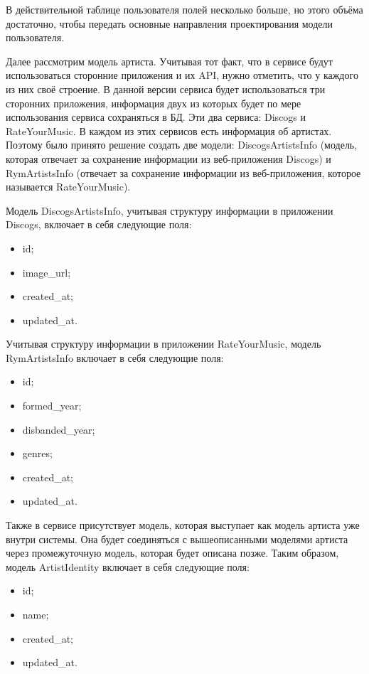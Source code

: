 В действительной таблице пользователя полей несколько больше, но этого объёма достаточно, чтобы передать основные направления проектирования модели пользователя.

Далее рассмотрим модель артиста. Учитывая тот факт, что в сервисе будут использоваться сторонние приложения и их API, нужно отметить, что у каждого из них своё строение. В данной версии сервиса будет использоваться три сторонних приложения, информация двух из которых будет по мере использования сервиса сохраняться в БД. Эти два сервиса: Discogs и RateYourMusic. В каждом из этих сервисов есть информация об артистах. Поэтому было принято решение создать две модели: DiscogsArtistsInfo (модель, которая отвечает за сохранение информации из веб-приложения Discogs) и RymArtistsInfo (отвечает за сохранение информации из веб-приложения, которое называется RateYourMusic).

Модель DiscogsArtistsInfo, учитывая структуру информации в приложении Discogs, включает в себя следующие поля:

\begin{itemize}
  \item id;
  \item image\_url;
  \item created\_at;
  \item updated\_at.
\end{itemize}

Учитывая структуру информации в приложении RateYourMusic, модель RymArtistsInfo включает в себя следующие поля:

\begin{itemize}
  \item id;
  \item formed\_year;
  \item disbanded\_year;
  \item genres;
  \item created\_at;
  \item updated\_at.
\end{itemize}

Также в сервисе присутствует модель, которая выступает как модель артиста уже внутри системы. Она будет соединяться с вышеописанными моделями артиста через промежуточную модель, которая будет описана позже. Таким образом, модель ArtistIdentity включает в себя следующие поля:

\begin{itemize}
  \item id;
  \item name;
  \item created\_at;
  \item updated\_at.
\end{itemize}

